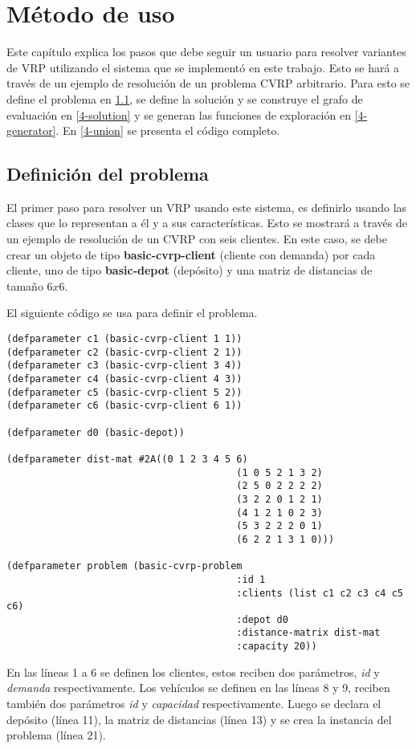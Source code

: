 \chapter{Método de uso}\label{chapter:Tutorial}

Este capítulo explica los pasos que debe seguir un usuario para resolver variantes de VRP utilizando el sistema que se implementó en este trabajo. Esto se hará a través de un ejemplo de resolución de un problema CVRP arbitrario. Para esto se define el problema en \ref{4-problem}, se define la solución y se construye el grafo de evaluación en \ref{4-solution} y se generan las funciones de exploración en \ref{4-generator}. En \ref{4-union} se presenta el código completo.

\section{Definición del problema}\label{4-problem}

El primer paso para resolver un VRP usando este sistema, es definirlo usando las clases que lo representan a él y a sus características. Esto se mostrará a través de un ejemplo de resolución de un CVRP con seis clientes. En este caso, se debe crear un objeto de tipo \textbf{basic-cvrp-client} (cliente con demanda) por cada cliente, uno de tipo \textbf{basic-depot} (depósito) y una matriz de distancias de tamaño $6x6$. 

El siguiente código se usa para definir el problema.

 \begin{lstlisting}
(defparameter c1 (basic-cvrp-client 1 1))
(defparameter c2 (basic-cvrp-client 2 1))
(defparameter c3 (basic-cvrp-client 3 4))
(defparameter c4 (basic-cvrp-client 4 3))
(defparameter c5 (basic-cvrp-client 5 2))
(defparameter c6 (basic-cvrp-client 6 1))

(defparameter d0 (basic-depot))

(defparameter dist-mat #2A((0 1 2 3 4 5 6)
										(1 0 5 2 1 3 2)
										(2 5 0 2 2 2 2)
										(3 2 2 0 1 2 1)
										(4 1 2 1 0 2 3)
										(5 3 2 2 2 0 1)
										(6 2 2 1 3 1 0)))

(defparameter problem (basic-cvrp-problem 
										:id 1 
										:clients (list c1 c2 c3 c4 c5 c6)
										:depot d0 
										:distance-matrix dist-mat 
										:capacity 20))
\end{lstlisting}

En las líneas 1 a 6 se definen los clientes, estos reciben dos parámetros, \textit{id} y \textit{demanda} respectivamente. Los vehículos se definen en las líneas 8 y 9, reciben también dos parámetros \textit{id} y \textit{capacidad} respectivamente. Luego se declara el depósito (línea 11), la matriz de distancias (línea 13) y se crea la instancia del problema (línea 21).

